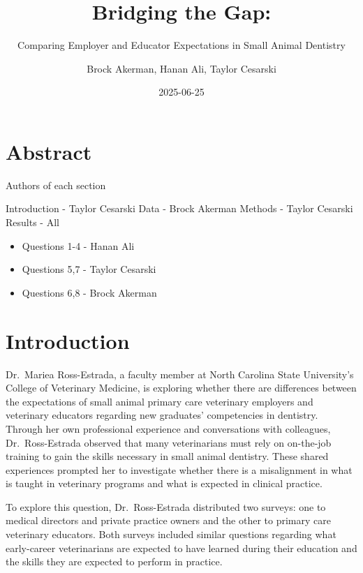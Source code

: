 \documentclass[
  11pt,
  letterpaper,
  DIV=11,
  numbers=noendperiod]{scrartcl}
\title{Bridging the Gap:}
\subtitle{Comparing Employer and Educator Expectations in Small Animal
Dentistry}
\author{Brock Akerman, Hanan Ali, Taylor Cesarski}
\date{2025-06-25}
\providecommand{\tightlist}{%
  \setlength{\itemsep}{0pt}\setlength{\parskip}{0pt}}\usepackage{longtable,booktabs,array}
\numberwithin{figure}{section}
\renewcommand*\contentsname{Table of contents}
\newcommand\contentsname{Table of contents}
\begin{document}
\maketitle
\ifdefined\Shaded\renewenvironment{Shaded}{\begin{tcolorbox}[breakable, interior hidden, enhanced, borderline west={3pt}{0pt}{shadecolor}, frame hidden, boxrule=0pt, sharp corners]}{\end{tcolorbox}}\fi

\renewcommand*\contentsname{Table of contents}
{
\hypersetup{linkcolor=}
\setcounter{tocdepth}{2}
\tableofcontents
}
\hypertarget{abstract}{%
\section{Abstract}\label{abstract}}

Authors of each section

Introduction - Taylor Cesarski Data - Brock Akerman Methods - Taylor
Cesarski Results - All

\begin{itemize}
\tightlist
\item
  Questions 1-4 - Hanan Ali
\item
  Questions 5,7 - Taylor Cesarski
\item
  Questions 6,8 - Brock Akerman
\end{itemize}

\hypertarget{introduction}{%
\section{Introduction}\label{introduction}}

Dr.~Mariea Ross-Estrada, a faculty member at North Carolina State
University's College of Veterinary Medicine, is exploring whether there
are differences between the expectations of small animal primary care
veterinary employers and veterinary educators regarding new graduates'
competencies in dentistry. Through her own professional experience and
conversations with colleagues, Dr.~Ross-Estrada observed that many
veterinarians must rely on on-the-job training to gain the skills
necessary in small animal dentistry. These shared experiences prompted
her to investigate whether there is a misalignment in what is taught in
veterinary programs and what is expected in clinical practice.

To explore this question, Dr.~Ross-Estrada distributed two surveys: one
to medical directors and private practice owners and the other to
primary care veterinary educators. Both surveys included similar
questions regarding what early-career veterinarians are expected to have
learned during their education and the skills they are expected to
perform in practice.
\end{document}
